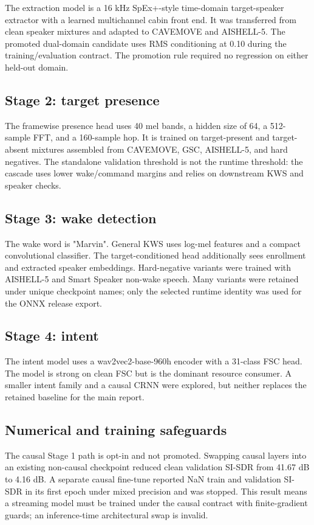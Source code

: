 \documentclass[11pt,a4paper]{article}
\begin{document}
The extraction model is a 16 kHz SpEx+-style time-domain target-speaker
extractor with a learned multichannel cabin front end. It was transferred
from clean speaker mixtures and adapted to CAVEMOVE and AISHELL-5. The
promoted dual-domain candidate uses RMS conditioning at 0.10 during the
training/evaluation contract. The promotion rule required no regression on
either held-out domain.

\subsection{Stage 2: target presence}

The framewise presence head uses 40 mel bands, a hidden size of 64, a
512-sample FFT, and a 160-sample hop. It is trained on target-present and
target-absent mixtures assembled from CAVEMOVE, GSC, AISHELL-5, and hard
negatives. The standalone validation threshold is not the runtime threshold:
the cascade uses lower wake/command margins and relies on downstream KWS and
speaker checks.

\subsection{Stage 3: wake detection}

The wake word is "Marvin". General KWS uses log-mel features and a compact
convolutional classifier. The target-conditioned head additionally sees
enrollment and extracted speaker embeddings. Hard-negative variants were
trained with AISHELL-5 and Smart Speaker non-wake speech. Many variants were
retained under unique checkpoint names; only the selected runtime identity
was used for the ONNX release export.

\subsection{Stage 4: intent}

The intent model uses a wav2vec2-base-960h encoder with a 31-class FSC head.
The model is strong on clean FSC but is the dominant resource consumer. A
smaller intent family and a causal CRNN were explored, but neither replaces
the retained baseline for the main report.

\subsection{Numerical and training safeguards}

The causal Stage 1 path is opt-in and not promoted. Swapping causal layers
into an existing non-causal checkpoint reduced clean validation SI-SDR from
41.67 dB to 4.16 dB. A separate causal fine-tune reported NaN train and
validation SI-SDR in its first epoch under mixed precision and was stopped.
This result means a streaming model must be trained under the causal contract
with finite-gradient guards; an inference-time architectural swap is invalid.
\end{document}
